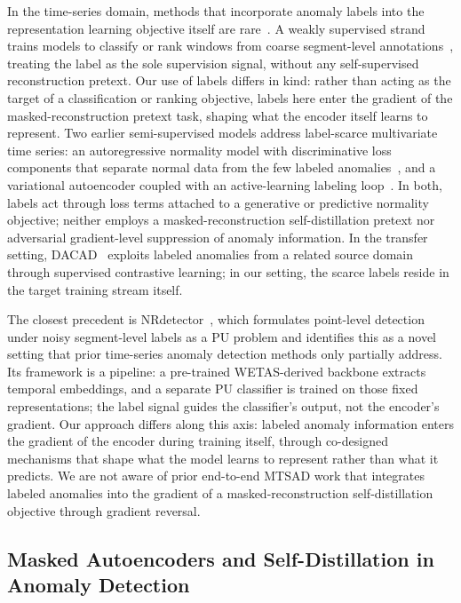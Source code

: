 In the time-series domain, methods that incorporate anomaly labels into the representation learning objective itself are rare~\cite{wang2025nrdetector}.
A weakly supervised strand trains models to classify or rank windows from coarse segment-level annotations~\cite{sultani2018deepmil,lee2021wetas,liu2024treemil}, treating the label as the sole supervision signal, without any self-supervised reconstruction pretext.
Our use of labels differs in kind: rather than acting as the target of a classification or ranking objective, labels here enter the gradient of the masked-reconstruction pretext task, shaping what the encoder itself learns to represent.
Two earlier semi-supervised models address label-scarce multivariate time series: an autoregressive normality model with discriminative loss components that separate normal data from the few labeled anomalies~\cite{xue2022fewpositive}, and a variational autoencoder coupled with an active-learning labeling loop~\cite{huang2022slavae}.
In both, labels act through loss terms attached to a generative or predictive normality objective; neither employs a masked-reconstruction self-distillation pretext nor adversarial gradient-level suppression of anomaly information.
In the transfer setting, DACAD~\cite{darban2024dacad} exploits labeled anomalies from a related source domain through supervised contrastive learning; in our setting, the scarce labels reside in the target training stream itself.

The closest precedent is NRdetector~\cite{wang2025nrdetector}, which formulates point-level detection under noisy segment-level labels as a PU problem and identifies this as a novel setting that prior time-series anomaly detection methods only partially address.
Its framework is a pipeline: a pre-trained WETAS-derived backbone extracts temporal embeddings, and a separate PU classifier is trained on those fixed representations; the label signal guides the classifier's output, not the encoder's gradient.
Our approach differs along this axis: labeled anomaly information enters the gradient of the encoder during training itself, through co-designed mechanisms that shape what the model learns to represent rather than what it predicts.
We are not aware of prior end-to-end MTSAD work that integrates labeled anomalies into the gradient of a masked-reconstruction self-distillation objective through gradient reversal.

\subsection{Masked Autoencoders and Self-Distillation in Anomaly Detection}
\label{sec:related_mae}

